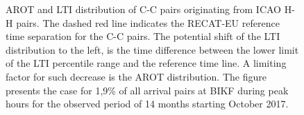 \begin{figure}[h]
    \centering
    
    

    
    \caption[AROT and LTI of C-C pairs originating from ICAO H-H pairs]{AROT and LTI distribution of C-C pairs originating from ICAO H-H pairs. The dashed red line indicates the RECAT-EU reference time separation for the C-C pairs. The potential shift of the LTI distribution to the left, is the time difference between the lower limit of the LTI percentile range and the reference time line. A limiting factor for such decrease is the AROT distribution. The figure presents the case for 1,9\% of all arrival pairs at BIKF during peak hours for the observed period of 14 months starting October 2017.}\label{fig:CC_from_HH_pairs_time_sep}
\end{figure}



